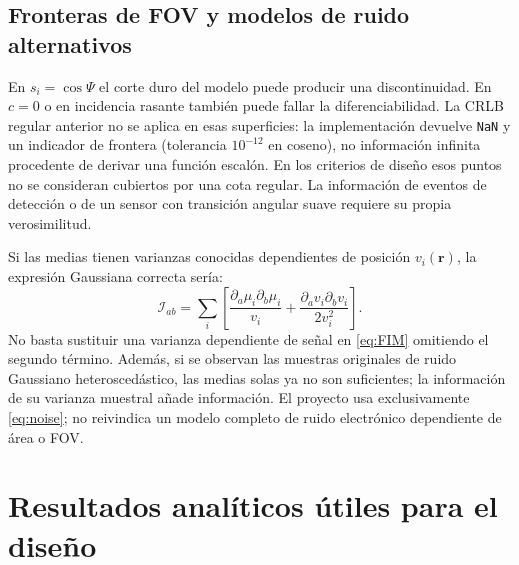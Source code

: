 \documentclass[11pt,a4paper]{article}
\begin{document}
\subsection{Fronteras de FOV y modelos de ruido alternativos}
En $s_i=\cos\Psi$ el corte duro del modelo puede producir una discontinuidad. En $c=0$ o en incidencia rasante también puede fallar la diferenciabilidad. La CRLB regular anterior no se aplica en esas superficies: la implementación devuelve \texttt{NaN} y un indicador de frontera (tolerancia $10^{-12}$ en coseno), no información infinita procedente de derivar una función escalón. En los criterios de diseño esos puntos no se consideran cubiertos por una cota regular. La información de eventos de detección o de un sensor con transición angular suave requiere su propia verosimilitud.

Si las medias tienen varianzas conocidas dependientes de posición $v_i(\mathbf r)$, la expresión Gaussiana correcta sería:
\begin{equation}
\mathcal I_{ab}=\sum_i\left[\frac{\partial_a\mu_i\partial_b\mu_i}{v_i}
+\frac{\partial_a v_i\partial_b v_i}{2v_i^2}\right].
\label{eq:hetero}
\end{equation}
No basta sustituir una varianza dependiente de señal en \eqref{eq:FIM} omitiendo el segundo término. Además, si se observan las muestras originales de ruido Gaussiano heteroscedástico, las medias solas ya no son suficientes; la información de su varianza muestral añade información. El proyecto usa exclusivamente \eqref{eq:noise}; no reivindica un modelo completo de ruido electrónico dependiente de área o FOV.

\section{Resultados analíticos útiles para el diseño}
\end{document}
